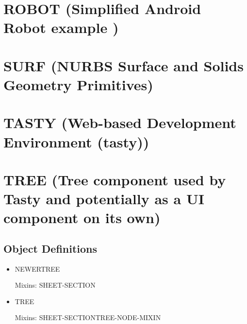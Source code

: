 \documentclass [11pt]{book}
\begin{document}
\section{ROBOT (Simplified Android Robot example )}

\label{sec:robot(simplifiedandroidrobotexample)}







\section{SURF (NURBS Surface and Solids Geometry Primitives)}

\label{sec:surf(nurbssurfaceandsolidsgeometryprimitives)}







\section{TASTY (Web-based Development Environment (tasty))}

\label{sec:tasty(web-baseddevelopmentenvironment(tasty))}







\section{TREE (Tree component used by Tasty and potentially as a UI component on its own)}

\label{sec:tree(treecomponentusedbytastyandpotentiallyasauicomponentonitsown)}





\subsection{Object Definitions}

\label{subsec:objectdefinitions}



\begin{itemize}

\item {}NEWERTREE

Mixins: SHEET-SECTION



\item {}TREE

Mixins: SHEET-SECTIONTREE-NODE-MIXIN



\end{itemize}
\end{document}
